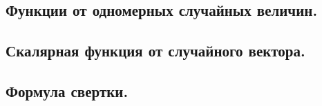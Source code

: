 \subsection{Функции от одномерных случайных величин.}



\newpage
\subsection{Скалярная функция от случайного вектора.}



\newpage
\subsection{Формула свертки.}

